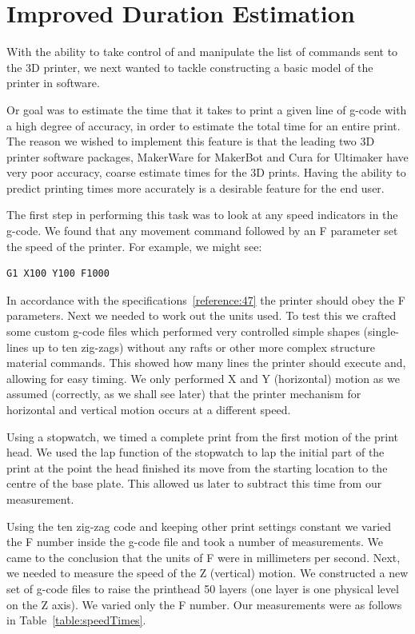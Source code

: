 \documentclass[11pt]{report} %
\begin{document}
\section{Improved Duration Estimation}
	With the ability to take control of and manipulate the list of commands sent to the 3D printer, we next wanted to tackle constructing a basic model of the printer in software.

	Or goal was to estimate the time that it takes to print a given line of g-code with a high degree of accuracy, in order to estimate the total time for an entire print. The reason we wished to implement this feature is that the leading two 3D printer software packages, MakerWare for MakerBot and Cura for Ultimaker have very poor accuracy, coarse estimate times for the 3D prints. Having the ability to predict printing times more accurately is a desirable feature for the end user.

	The first step in performing this task was to look at any speed indicators in the g-code. We found that any movement command followed by an F parameter set the speed of the printer. For example, we might see:
\begin{verbatim}
G1 X100 Y100 F1000
\end{verbatim}

In accordance with the specifications~\ref{reference:47} the printer should obey the F parameters. Next we needed to work out the units used. To test this we crafted some custom g-code files which performed very controlled simple shapes (single-lines up to ten zig-zags) without any rafts or other more complex structure material commands. This showed how many lines the printer should execute and, allowing for easy timing. We only performed X and Y (horizontal) motion as we assumed (correctly, as we shall see later) that the printer mechanism for horizontal and vertical motion occurs at a different speed.

	Using a stopwatch, we timed a complete print from the first motion of the print head. We used the lap function of the stopwatch to lap the initial part of the print at the point the head finished its move from the starting location to the centre of the base plate. This allowed us later to subtract this time from our measurement.

	Using the ten zig-zag code and keeping other print settings constant we varied the F number inside the g-code file and took a number of measurements. We came to the conclusion that the units of F were in millimeters per second. Next, we needed to measure the speed of the Z (vertical) motion. We constructed a new set of g-code files to raise the printhead 50 layers (one layer is one physical level on the Z axis). We varied only the F number. Our measurements were as follows in Table~\ref{table:speedTimes}.
\end{document}
